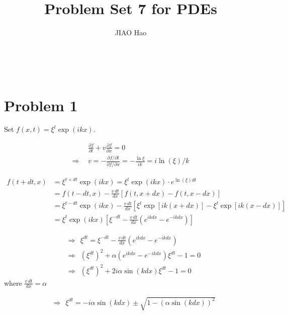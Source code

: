 \documentclass[showpacs, oneside, onecolumn, prl, amsmath, amssymb, nofootinbib, superscriptaddress, notitlepage]{revtex4-1}
\newcommand\bas{\begin{align*}}
\newcommand\RA{$\ \ \Rightarrow\ \ $}
\begin{document}
	
\title{Problem Set 7 for PDEs}

\author{JIAO Hao}

\maketitle

~~~~

\section{Problem 1}

Set $f(x,t)=\xi^t\exp(ikx)$.

\bas
&\frac{\partial f}{\partial t}+v\frac{\partial f}{\partial x}=0\\
\Rightarrow\ \ &v=-\frac{\partial f/\partial t}{\partial f/\partial x}=-\frac{\ln\xi}{ik}=i\ln(\xi)/k
\end{align*}


\bas
f(t+dt,x)&=\xi^{t+dt}\exp(ikx)=\xi^t\exp(ikx)\cdot e^{\ln(\xi)dt}\\
&=f(t-dt,x)-\frac{v\,dt}{dx}[f(t,x+dx)-f(t,x-dx)]\\
&=\xi^{t-dt}\exp(ikx)-\frac{v\,dt}{dx}[\xi^t\exp[ik(x+dx)]-\xi^t\exp[ik(x-dx)]]\\
&=\xi^t\exp(ikx)[\xi^{-dt}-\frac{v\,dt}{dx}(e^{ikdx}-e^{-ikdx})]
\end{align*}

\bas
&\Rightarrow\ \ \xi^{dt}=\xi^{-dt}-\frac{v\,dt}{dx}(e^{ikdx}-e^{-ikdx})\\
&\Rightarrow\ \ (\xi^{dt})^2+\alpha(e^{ikdx}-e^{-ikdx})\xi^{dt}-1=0\\
&\Rightarrow\ \ (\xi^{dt})^2+2i\alpha\sin(kdx)\xi^{dt}-1=0
\end{align*}
where $\frac{v\,dt}{dx}=\alpha$

\bas
&\Rightarrow\ \ \xi^{dt}=-i\alpha\sin(kdx)\pm\sqrt{1-(\alpha\sin(kdx))^2}
\end{align*}

\end{document}

